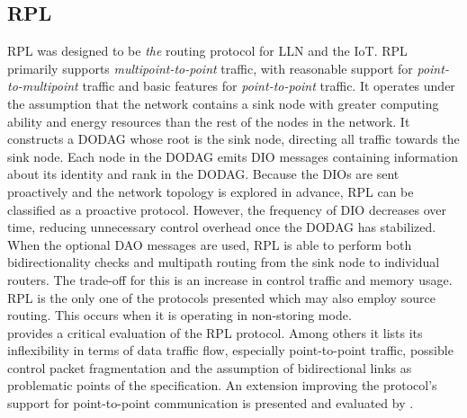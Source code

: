 \subsection{RPL}
\label{subsec:rpl}
\gls{RPL} \cite{RFC-6550} was designed to be \emph{the} routing protocol for \gls{LLN} and the \gls{IoT}. %
RPL primarily supports \emph{multipoint-to-point} traffic, with reasonable support for \emph{point-to-multipoint} traffic and basic features for \emph{point-to-point} traffic. %
It operates under the assumption that the network contains a \gls{sink node} with greater computing ability and energy resources than the rest of the nodes in the network. It constructs a \gls{DODAG} whose root is the sink node, directing all traffic towards the sink node. Each node in the DODAG emits \gls{DIO} messages containing information about its identity and rank in the DODAG. Because the \glspl{DIO} are sent proactively and the network topology is explored in advance, RPL can be classified as a proactive protocol.
However, the frequency of \gls{DIO} decreases over time, reducing unnecessary control overhead once the DODAG has stabilized.\\
When the optional \gls{DAO} messages are used, RPL is able to perform both bidirectionality checks and multipath routing from the sink node to individual routers. The trade-off for this is an increase in control traffic and memory usage. RPL is the only one of the protocols presented which may also employ source routing. This occurs when it is operating in non-storing mode.\\
\cite{chp-ceirp-11} provides a critical evaluation of the RPL protocol. Among others it lists its inflexibility in terms of data traffic flow, especially point-to-point traffic, possible control packet fragmentation and the assumption of bidirectional links as problematic points of the specification.
An extension improving the protocol's support for point-to-point communication is presented and evaluated by \cite{baccelli_p2p_prl}.



